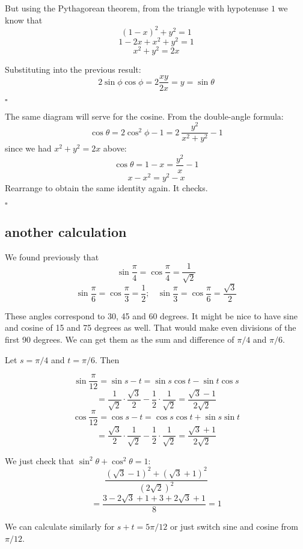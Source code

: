 \documentclass[11pt, oneside]{article}
\begin{document}
But using the Pythagorean theorem, from the triangle with hypotenuse $1$ we know that
\[ (1 - x)^2 + y^2 = 1 \]
\[ 1 - 2x + x^2 + y^2 = 1 \]
\[ x^2 + y^2 = 2x \]

Substituting into the previous result:
\[ 2 \sin \phi \cos \phi = 2 \frac{xy}{2x} = y = \sin \theta \]

$\square$

The same diagram will serve for the cosine.  From the double-angle formula:
\[ \cos \theta = 2 \cos^2 \phi - 1 = 2 \ \frac{y^2}{x^2 + y^2} - 1 \]
since we had $x^2 + y^2 = 2x$ above:
\[ \cos \theta = 1 - x = \frac{y^2}{x} - 1 \]
\[ x - x^2 = y^2 - x \]
Rearrange to obtain the same identity again.  It checks.

$\square$

\subsection*{another calculation}
We found previously that 
\[ \sin \frac{\pi}{4} = \cos \frac{\pi}{4} = \frac{1}{\sqrt{2}} \]
\[ \sin \frac{\pi}{6} = \cos \frac{\pi}{3} = \frac{1}{2}; \ \ \ \ \sin \frac{\pi}{3} = \cos \frac{\pi}{6} = \frac{\sqrt{3}}{2} \]

These angles correspond to 30, 45 and 60 degrees.  It might be nice to have sine and cosine of 15 and 75 degrees as well.  That would make even divisions of the first 90 degrees.  We can get them as the sum and difference of $\pi/4$ and $\pi/6$.

Let $s = \pi/4$ and $t = \pi/6$.  Then

\[ \sin \frac{\pi}{12} = \sin s - t = \sin s \cos t - \sin t \cos s \]
\[ = \frac{1}{\sqrt{2}} \cdot \frac{\sqrt{3}}{2} - \frac{1}{2} \cdot \frac{1}{\sqrt{2}} = \frac{\sqrt{3} - 1}{2 \sqrt{2}} \]
\[ \cos \frac{\pi}{12} = \cos s - t = \cos s \cos t + \sin s \sin t \]
\[ = \frac{\sqrt{3}}{2} \cdot \frac{1}{\sqrt{2}} - \frac{1}{2} \cdot \frac{1}{\sqrt{2}} = \frac{\sqrt{3} + 1}{2 \sqrt{2}} \]

We just check that $\sin^2 \theta + \cos^2 \theta = 1$:
\[ \frac{(\sqrt{3} - 1)^2 + (\sqrt{3} + 1)^2}{(2 \sqrt{2})^2} \]
\[ = \frac{3 - 2 \sqrt{3} + 1 + 3 + 2 \sqrt{3} + 1}{8} = 1 \]

We can calculate similarly for $s + t = 5 \pi/12$ or just switch sine and cosine from $\pi/12$.
\end{document}
